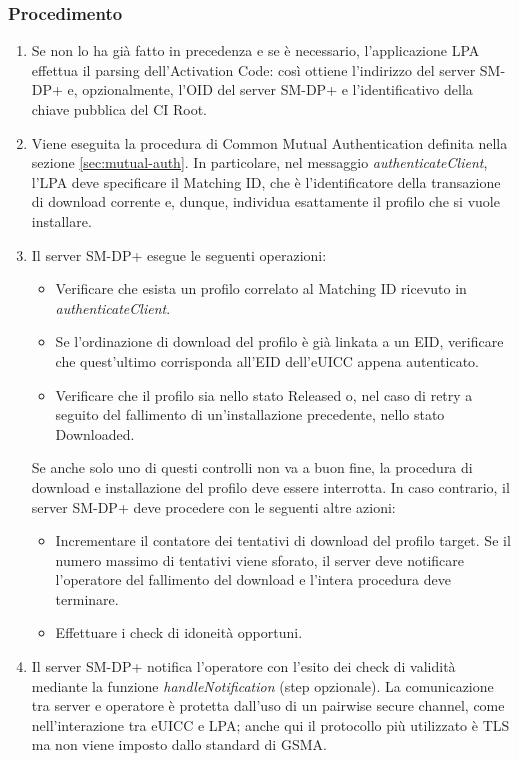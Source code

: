 \documentclass[10pt, oneside]{book}
\begin{document}
\subsubsection{Procedimento}
\begin{enumerate}
\item Se non lo ha già fatto in precedenza e se è necessario, l'applicazione LPA effettua il parsing dell'Activation Code: così ottiene l'indirizzo del server SM-DP+ e, opzionalmente, l'OID del server SM-DP+ e l'identificativo della chiave pubblica del CI Root.
\item Viene eseguita la procedura di Common Mutual Authentication definita nella sezione \ref{sec:mutual-auth}. In particolare, nel messaggio \textit{authenticateClient}, l'LPA deve specificare il Matching ID, che è l'identificatore della transazione di download corrente e, dunque, individua esattamente il profilo che si vuole installare.
\item Il server SM-DP+ esegue le seguenti operazioni:
\begin{itemize}[itemsep=0pt]
\item Verificare che esista un profilo correlato al Matching ID ricevuto in \textit{authenticateClient}.
\item Se l'ordinazione di download del profilo è già linkata a un EID, verificare che quest'ultimo corrisponda all'EID dell'eUICC appena autenticato.
\item Verificare che il profilo sia nello stato Released o, nel caso di retry a seguito del fallimento di un'installazione precedente, nello stato Downloaded.
\end{itemize}
Se anche solo uno di questi controlli non va a buon fine, la procedura di download e installazione del profilo deve essere interrotta. In caso contrario, il server SM-DP+ deve procedere con le seguenti altre azioni:
\begin{itemize}[itemsep=0pt]
\item Incrementare il contatore dei tentativi di download del profilo target. Se il numero massimo di tentativi viene sforato, il server deve notificare l'operatore del fallimento del download e l'intera procedura deve terminare.
\item Effettuare i check di idoneità opportuni.
\end{itemize}
\item Il server SM-DP+ notifica l'operatore con l'esito dei check di validità mediante la funzione \textit{handleNotification} (step opzionale). La comunicazione tra server e operatore è protetta dall'uso di un pairwise secure channel, come nell'interazione tra eUICC e LPA; anche qui il protocollo più utilizzato è TLS ma non viene imposto dallo standard di GSMA.

\end{enumerate}
\end{document}
